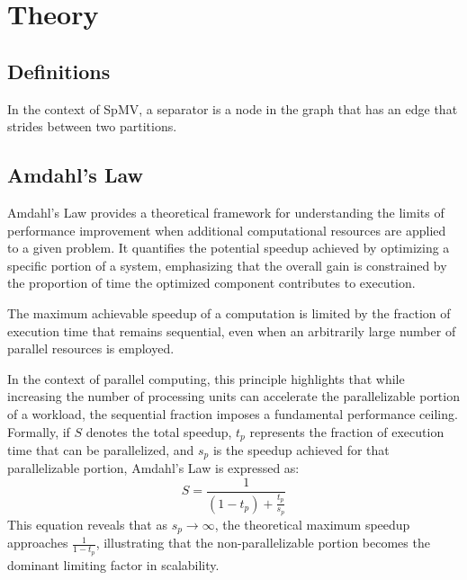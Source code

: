 
\chapter{Theory}

\section{Definitions}

\begin{definition}[Separator]
    In the context of SpMV, a separator is a node in the graph that has an edge that strides between two partitions.
\end{definition}

\section{Amdahl's Law}

Amdahl’s Law provides a theoretical framework for understanding the limits of performance improvement when additional computational resources are applied to a given problem. It quantifies the potential speedup achieved by optimizing a specific portion of a system, emphasizing that the overall gain is constrained by the proportion of time the optimized component contributes to execution.

\begin{definition} The maximum achievable speedup of a computation is limited by the fraction of execution time that remains sequential, even when an arbitrarily large number of parallel resources is employed. \end{definition}

In the context of parallel computing, this principle highlights that while increasing the number of processing units can accelerate the parallelizable portion of a workload, the sequential fraction imposes a fundamental performance ceiling. Formally, if \(S\)  denotes the total speedup, \(t_{p}\) represents the fraction of execution time that can be parallelized, and \(s_{p}\) is the speedup achieved for that parallelizable portion, Amdahl’s Law is expressed as:
\begin{equation} S = \frac{1}{(1 - t_p) + \frac{t_p}{s_p}} \end{equation}
This equation reveals that as \(s_{p} \rightarrow \infty\), the theoretical maximum speedup approaches \(\frac{1}{1-t_{p}}\), illustrating that the non-parallelizable portion becomes the dominant limiting factor in scalability.


